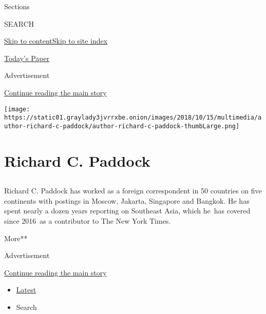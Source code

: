 Sections

SEARCH

\protect\hyperlink{site-content}{Skip to
content}\protect\hyperlink{site-index}{Skip to site index}

\href{https://myaccount.nytimes3xbfgragh.onion/auth/login?response_type=cookie\&client_id=vi}{}

\href{https://www.nytimes3xbfgragh.onion/section/todayspaper}{Today's
Paper}

Advertisement

\protect\hyperlink{after-top}{Continue reading the main story}

\texttt{[image: https://static01.graylady3jvrrxbe.onion/images/2018/10/15/multimedia/author-richard-c-paddock/author-richard-c-paddock-thumbLarge.png]}

\hypertarget{richard-c-paddock}{%
\section{Richard C. Paddock}\label{richard-c-paddock}}

\subsection{}

Richard C. Paddock has worked as a foreign correspondent in 50 countries
on five continents with postings in Moscow, Jakarta, Singapore and
Bangkok. He has spent nearly a dozen years reporting on Southeast Asia,
which he~has covered since 2016~as a contributor to The New York Times.

More**

Advertisement

\protect\hyperlink{after-mid1}{Continue reading the main story}

\begin{itemize}
\tightlist
\item
  \protect\hyperlink{stream-panel}{Latest}
\item
  Search
\end{itemize}

